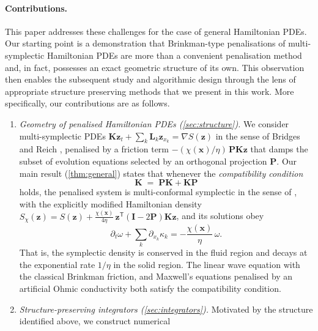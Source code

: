 \documentclass[11pt]{article}
\theoremstyle{definition}
\theoremstyle{remark}
\newcommand{\bz}{\bm{z}}
\newcommand{\bx}{\bm{x}}
\newcommand{\bE}{\bm{E}}
\newcommand{\bH}{\bm{H}}
\newcommand{\bK}{\bm{K}}
\newcommand{\bL}{\bm{L}}
\newcommand{\bP}{\bm{P}}
\newcommand{\bI}{\bm{I}}
\newcommand{\chixx}{\chi(\bx)}
\begin{document}
\paragraph{Contributions.}
This paper addresses these challenges for the case of general
Hamiltonian PDEs. Our starting point is a demonstration that Brinkman-type penalisations of multi-symplectic Hamiltonian PDEs are more than a convenient penalisation method and, in fact, possesses an exact geometric structure of its own. This observation then enables the subsequent study and algorithmic design through the lens of appropriate structure preserving methods that we present in this work. More specifically, our contributions are as follows.
\begin{enumerate}[leftmargin=2em]
\item \emph{Geometry of penalised Hamiltonian PDEs
(\cref{sec:structure}).}
We consider multi-symplectic PDEs
$\bK\bz_t+\sum_k\bL_k\bz_{x_k}=\nabla S(\bz)$ in the sense of Bridges
and Reich \cite{bridges1997multi,bridges2001multi}, penalised by a
friction term $-(\chixx/\eta)\,\bP\bK\bz$ that damps the subset of
evolution equations selected by an orthogonal projection $\bP$.  Our
main result (\cref{thm:general}) states that whenever the
\emph{compatibility condition}
\begin{equation*}
\bK \;=\; \bP\bK + \bK\bP
\end{equation*}
holds, the penalised system is
multi-conformal symplectic in the sense of
\cite{mclachlan2001conformal,moore2013conformal}, with the explicitly
modified Hamiltonian density
$S_\chi(\bz)=S(\bz)+\frac{\chixx}{4\eta}\,
\bz^{\mathsf T}(\bI-2\bP)\bK\bz$, and its solutions obey
\begin{equation*}
\partial_t\omega + \sum_{k}\partial_{x_k}\kappa_k
= -\frac{\chixx}{\eta}\,\omega.
\end{equation*}
That is, the symplectic density is conserved in the fluid region and
decays at the exponential rate $1/\eta$ in the solid region.  The
linear wave equation with the classical Brinkman friction,
and Maxwell's equations penalised by an
artificial Ohmic conductivity both satisfy the
compatibility condition. 
\item \emph{Structure-preserving integrators
(\cref{sec:integrators}).}
Motivated by the structure identified above, we construct numerical

\end{enumerate}
\end{document}
